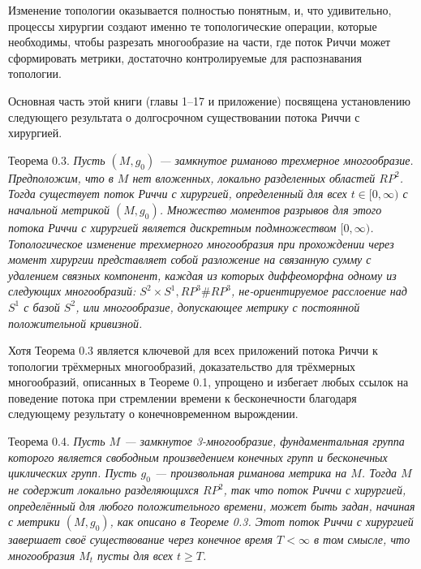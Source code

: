 Изменение топологии оказывается полностью понятным, и, что удивительно, 
процессы хирургии создают именно те топологические операции, которые необходимы, 
чтобы разрезать многообразие на части, где поток Риччи может сформировать 
метрики, достаточно контролируемые для распознавания топологии.

Основная часть этой книги (главы 1–17 и приложение) посвящена установлению 
следующего результата о долгосрочном существовании потока Риччи с хирургией.\vspace{0.5em}

Теорема 0.3. \textit{Пусть $(M, g_{0})$ — замкнутое риманово трехмерное 
многообразие. Предположим, что в $M$ нет вложенных, локально разделенных областей 
$RP^{2}$. Тогда существует поток Риччи с хирургией, 
определенный для всех $t\in [0,\infty)$ с начальной метрикой $(M, g_{0})$. 
Множество моментов разрывов для этого потока Риччи с хирургией является 
дискретным подмножеством $[0,\infty)$.
Топологическое изменение трехмерного многообразия при прохождении через 
момент хирургии представляет собой разложение на связанную сумму с 
удалением связных компонент, каждая из которых диффеоморфна одному из 
следующих многообразий: $S^{2}\times S^{1}, RP^{3} \# RP^{3}$, не-ориентируемое 
расслоение над $S^{1}$ с базой $S^{2}$, или многообразие, допускающее 
метрику с постоянной положительной кривизной.}\vspace{0.5em}

Хотя Теорема 0.3 является ключевой для всех приложений потока Риччи к 
топологии трёхмерных многообразий, доказательство для трёхмерных многообразий, 
описанных в Теореме 0.1, упрощено и избегает любых ссылок на поведение потока 
при стремлении времени к бесконечности благодаря следующему результату о 
конечновременном вырождении.\vspace{0.5em}

Теорема 0.4. \textit{Пусть $M$ — замкнутое 3-многообразие, фундаментальная группа которого 
является свободным произведением конечных групп и бесконечных циклических групп. 
Пусть $g_{0}$ — произвольная риманова метрика на $M$. Тогда $M$ не содержит локально 
разделяющихся $RP^{2}$, так что поток Риччи с хирургией, определённый для любого 
положительного времени, может быть задан, начиная с метрики $(M,g_{0})$, как описано 
в Теореме 0.3. Этот поток Риччи с хирургией завершает своё существование через 
конечное время $T<\infty$ в том смысле, что многообразия $M_{t}$ пусты для всех $t \geq T$.}\vspace{0.5em}

